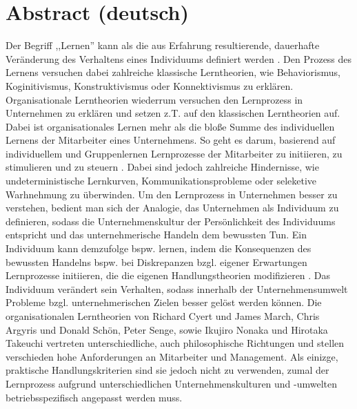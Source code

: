 \documentclass[12pt]{article}
\begin{document}
\maketitle

\section{Abstract (deutsch)}

Der Begriff ,,Lernen'' kann als die aus Erfahrung resultierende, dauerhafte
Veränderung des Verhaltens eines Individuums definiert werden
\cite{Lefrancois:2006}. Den Prozess des Lernens versuchen dabei zahlreiche
klassische Lerntheorien, wie Behaviorismus, Koginitivismus, Konstruktivismus
oder Konnektivismus zu erklären. Organisationale Lerntheorien wiederrum
versuchen den Lernprozess in Unternehmen zu erklären und setzen z.T. auf den
klassischen Lerntheorien auf. Dabei ist organisationales Lernen mehr als die
bloße Summe des individuellen Lernens der Mitarbeiter eines Unternehmens. So
geht es darum, basierend auf individuellem und Gruppenlernen Lernprozesse der
Mitarbeiter zu initiieren, zu stimulieren und zu steuern \cite{Franken:2002}.
Dabei sind jedoch zahlreiche Hindernisse, wie undeterministische Lernkurven,
Kommunikationsprobleme oder seleketive Warhnehmung zu überwinden. Um den
Lernprozess in Unternehmen besser zu verstehen, bedient man sich der Analogie,
das Unternehmen als Individuum zu definieren, sodass die Unternehmenskultur der
Persönlichkeit des Individuums entspricht und das unternehmerische Handeln dem
bewussten Tun. Ein Individuum kann demzufolge bspw. lernen, indem die
Konsequenzen des bewussten Handelns bspw. bei Diskrepanzen bzgl. eigener
Erwartungen Lernprozesse initiieren, die die eigenen Handlungstheorien
modifizieren \cite{Pawlowsky:1992}. Das Individuum verändert sein Verhalten,
sodass innerhalb der Unternehmensumwelt Probleme bzgl. unternehmerischen Zielen
besser gelöst werden können. Die organisationalen Lerntheorien von Richard
Cyert und James March, Chris Argyris und Donald Schön, Peter Senge, sowie
Ikujiro Nonaka und Hirotaka Takeuchi vertreten unterschiedliche, auch
philosophische Richtungen und stellen verschieden hohe Anforderungen an
Mitarbeiter und Management. Als einizge, praktische Handlungskriterien sind sie
jedoch nicht zu verwenden, zumal der Lernprozess aufgrund unterschiedlichen
Unternehmenskulturen und -umwelten betriebsspezifisch angepasst werden muss.
\end{document}
